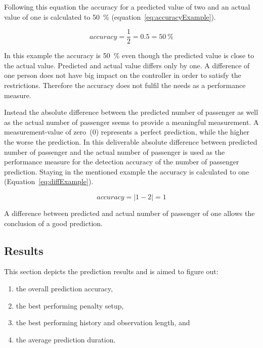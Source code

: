 Following this equation the accuracy for a predicted value of two and an actual value of one is calculated to 50~\% (equation~\ref{eq:accuracyExample}).

\begin{equation}
accuracy = \frac{1}{2} = 0.5 = 50~\%
\label{eq:accuracyExample}
\end{equation}

In this example the accuracy is 50~\% even though the predicted value is close to the actual value. Predicted and actual value differs only by one. A difference of one person does not have big impact on the controller in order to satisfy the restrictions. Therefore the accuracy does not fulfil the needs as a performance measure.

Instead the absolute difference between the predicted number of passenger as well as the actual number of passenger seems to provide a meaningful measurement. A measurement-value of zero~(0) represents a perfect prediction, while the higher the worse the prediction. In this deliverable absolute difference between predicted number of passenger and the actual number of passenger is used as the performance measure for the detection accuracy of the number of passenger prediction.
Staying in the mentioned example the accuracy is calculated to one (Equation~\ref{eq:diffExample}).

\begin{equation}
accuracy = |1-2| = 1
\label{eq:diffExample}
\end{equation}

A difference between predicted and actual number of passenger of one allows the conclusion of a good prediction. 


\subsection{Results}
\label{subsec:results}

This section depicts the prediction results and is aimed to figure out:

\begin{enumerate}
  \item the overall prediction accuracy,
  \item the best performing penalty setup,
  \item the best performing history and observation length, and
  \item the average prediction duration.
\end{enumerate}
